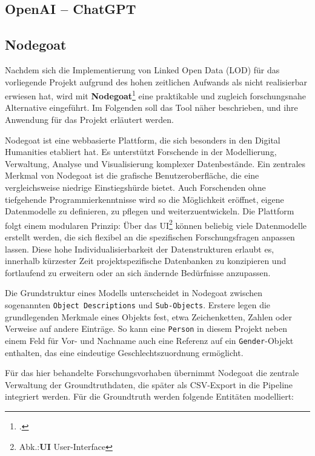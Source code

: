 \documentclass[12pt, a4paper, ngerman, bidi=default]{article}
\let\cite\footcite
\newcommand{\code}[1]{\colorbox{VeryLightGray}{\texttt{#1}}} %
\begin{document}
\subsection{OpenAI – ChatGPT}


\subsection{Nodegoat}\label{subsec:Nodegoat_chapter}

Nachdem sich die Implementierung von Linked Open Data (LOD) für das vorliegende Projekt aufgrund des hohen zeitlichen 
Aufwands als nicht realisierbar erwiesen hat, wird mit \textbf{Nodegoat}\cite{kessels_nodegoat_2013}
eine praktikable und zugleich forschungsnahe Alternative eingeführt. Im Folgenden soll das Tool näher beschrieben, und ihre Anwendung für das Projekt erläutert werden.

Nodegoat ist eine webbasierte Plattform, die sich besonders in den Digital Humanities etabliert hat. Es unterstützt Forschende in der Modellierung, 
Verwaltung, Analyse und Visualisierung komplexer Datenbestände. Ein zentrales Merkmal von Nodegoat ist die grafische Benutzeroberfläche, die eine vergleichsweise niedrige Einstiegshürde bietet. 
Auch Forschenden ohne tiefgehende Programmierkenntnisse wird so die Möglichkeit  eröffnet, eigene Datenmodelle zu definieren, zu pflegen und weiterzuentwickeln. 
Die Plattform folgt einem modularen Prinzip: Über das UI\footnote{Abk.:\textbf{UI} User-Interface} können beliebig viele Datenmodelle 
erstellt werden, die sich flexibel an die spezifischen Forschungsfragen anpassen lassen. Diese hohe Individualisierbarkeit der Datenstrukturen erlaubt es, innerhalb kürzester Zeit projektspezifische 
Datenbanken zu konzipieren und fortlaufend zu erweitern oder an sich ändernde Bedürfnisse anzupassen.

Die Grundstruktur eines Modells unterscheidet in Nodegoat zwischen sogenannten \code{Object Descriptions} und \code{Sub-Objects}. 
Erstere legen die grundlegenden Merkmale eines Objekts fest, etwa Zeichenketten, Zahlen oder Verweise auf andere Einträge. 
So kann eine \code{Person} in diesem Projekt neben einem Feld für Vor- und Nachname auch eine Referenz auf ein \code{Gender}-Objekt enthalten, 
das eine eindeutige Geschlechtszuordnung ermöglicht.

Für das hier behandelte Forschungsvorhaben übernimmt Nodegoat die zentrale Verwaltung der Groundtruthdaten, die später als CSV-Export in die Pipeline integriert werden. 
Für die Groundtruth werden folgende Entitäten modelliert:
\end{document}
